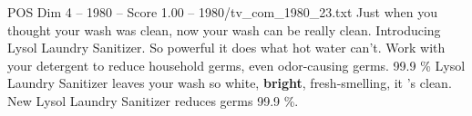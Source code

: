 \begin{textsample}{POS Dim 4 – 1980 – Score 1.00 – 1980/tv\_com\_1980\_23.txt}  \label{ex:f4_pos_066}
Just when you thought your wash was clean, now your wash can be really clean.
Introducing Lysol Laundry Sanitizer.
So powerful it does what hot water can't.
Work with your detergent to reduce household germs, even odor-causing germs. 99.9 \% Lysol Laundry Sanitizer leaves your wash so white, \textbf{bright}, fresh-smelling, it 's clean.
New Lysol Laundry Sanitizer reduces germs 99.9 \%.

\end{textsample}
